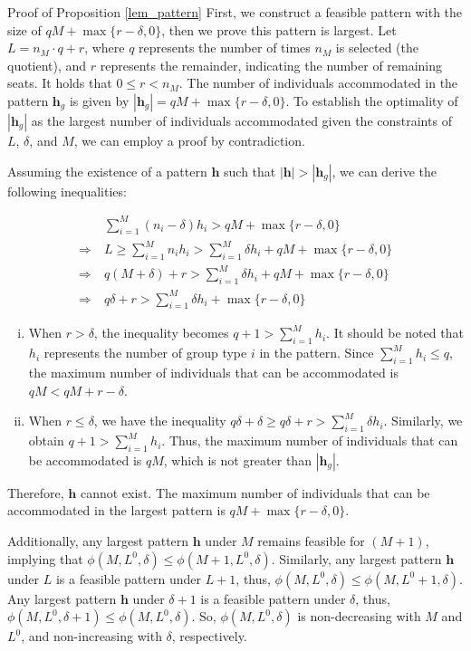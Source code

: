\begin{pf}{Proof of Proposition \ref{lem_pattern}}
First, we construct a feasible pattern with the size of $qM + \max\{r-\delta, 0\}$, then we prove this pattern is largest. Let $L = n_M \cdot q + r$, where $q$ represents the number of times $n_M$ is selected (the quotient), and $r$ represents the remainder, indicating the number of remaining seats. It holds that $0 \leq r < n_M$. The number of individuals accommodated in the pattern $\bm{h}_{g}$ is given by $|\bm{h}_{g}| = q M + \max\{r-\delta, 0\}$. To establish the optimality of $|\bm{h}_{g}|$ as the largest number of individuals accommodated given the constraints of $L$, $\delta$, and $M$, we can employ a proof by contradiction.

Assuming the existence of a pattern $\bm{h}$ such that $|\bm{h}| > |\bm{h}_{g}|$, we can derive the following inequalities:

\begin{align*}
  & \sum_{i=1}^{M} (n_i - \delta) h_i > q M + \max\{r-\delta, 0\} \\
  \Rightarrow ~& L \geq \sum_{i=1}^{M} n_i h_i > \sum_{i=1}^{M} \delta h_i + q M + \max\{r-\delta, 0\} \\
  \Rightarrow ~& q(M + \delta) + r > \sum_{i=1}^{M} \delta h_i + q M + \max\{r-\delta, 0\} \\
  \Rightarrow ~& q \delta + r > \sum_{i=1}^{M} \delta h_i + \max\{r-\delta, 0\}
\end{align*}

\begin{enumerate}[(i)]
  \item When $r > \delta$, the inequality becomes $q+1 > \sum_{i=1}^{M} h_i$. It should be noted that $h_i$ represents the number of group type $i$ in the pattern. Since $\sum_{i=1}^{M} h_i \leq q$, the maximum number of individuals that can be accommodated is $q M < q M + r-\delta$.  
  \item When $r \leq \delta$, we have the inequality $q \delta + \delta \geq q \delta + r > \sum_{i=1}^{M} \delta h_i$. Similarly, we obtain $q+1 > \sum_{i=1}^{M} h_i$. Thus, the maximum number of individuals that can be accommodated is $q M$, which is not greater than $|\bm{h}_{g}|$.  
\end{enumerate}

Therefore, $\bm{h}$ cannot exist. The maximum number of individuals that can be accommodated in the largest pattern is $q M + \max\{r-\delta, 0\}$.

Additionally, any largest pattern $\bm{h}$ under $M$ remains feasible for $(M+1)$, implying that $\phi(M, L^{0}, \delta) \leq \phi(M+1, L^{0}, \delta)$. Similarly, any largest pattern $\bm{h}$ under $L$ is a feasible pattern under $L+1$, thus, $\phi(M, L^{0}, \delta) \leq \phi(M, L^{0}+1, \delta)$. Any largest pattern $\bm{h}$ under $\delta+1$ is a feasible pattern under $\delta$, thus, $\phi(M, L^{0}, \delta+1) \leq \phi(M, L^{0}, \delta)$.
So, $\phi(M, L^{0}, \delta)$ is non-decreasing with $M$ and $L^{0}$, and non-increasing with $\delta$, respectively.

\end{pf}


